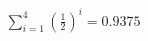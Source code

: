 \documentclass[preview]{standalone}
\begin{document}
\begin{align*}
\sum_{i=1}^{4} \left(\frac{1}{2}\right)^i = {0.9375}
\end{align*}
\end{document}
